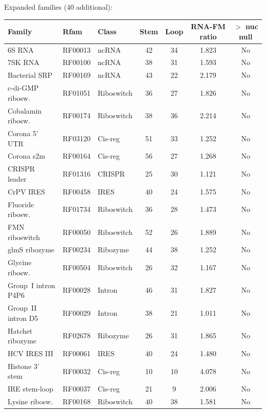 \documentclass[11pt]{article}
\begin{document}
Expanded families (40 additional):

\begin{table}[h]
\centering
\small
\begin{tabular}{@{}lllcccc@{}}
\toprule
\textbf{Family} & \textbf{Rfam} & \textbf{Class} & \textbf{Stem} & \textbf{Loop} &
  \textbf{RNA-FM ratio} & \textbf{$>$ nuc null} \\
\midrule
6S RNA              & RF00013 & ncRNA       & 42 & 34 & 1.823 & No \\
7SK RNA             & RF00100 & ncRNA       & 38 & 31 & 1.593 & No \\
Bacterial SRP       & RF00169 & ncRNA       & 43 & 22 & 2.179 & No \\
c-di-GMP ribosw.    & RF01051 & Riboswitch  & 36 & 27 & 1.826 & No \\
Cobalamin ribosw.   & RF00174 & Riboswitch  & 38 & 36 & 2.214 & No \\
Corona 5' UTR       & RF03120 & Cis-reg     & 51 & 33 & 1.252 & No \\
Corona s2m          & RF00164 & Cis-reg     & 56 & 27 & 1.268 & No \\
CRISPR leader       & RF01316 & CRISPR      & 25 & 30 & 1.121 & No \\
CrPV IRES           & RF00458 & IRES        & 40 & 24 & 1.575 & No \\
Fluoride ribosw.    & RF01734 & Riboswitch  & 36 & 28 & 1.473 & No \\
FMN riboswitch      & RF00050 & Riboswitch  & 52 & 26 & 1.889 & No \\
glmS ribozyme       & RF00234 & Ribozyme    & 44 & 38 & 1.252 & No \\
Glycine ribosw.     & RF00504 & Riboswitch  & 26 & 32 & 1.167 & No \\
Group~I intron P4P6 & RF00028 & Intron      & 46 & 31 & 1.827 & No \\
Group~II intron D5  & RF00029 & Intron      & 38 & 21 & 1.011 & No \\
Hatchet ribozyme    & RF02678 & Ribozyme    & 26 & 31 & 1.865 & No \\
HCV IRES III        & RF00061 & IRES        & 40 & 24 & 1.480 & No \\
Histone 3' stem     & RF00032 & Cis-reg     & 10 & 10 & 4.078 & No \\
IRE stem-loop       & RF00037 & Cis-reg     & 21 &  9 & 2.006 & No \\
Lysine ribosw.      & RF00168 & Riboswitch  & 40 & 38 & 1.581 & No \\

\end{tabular}
\end{table}
\end{document}
